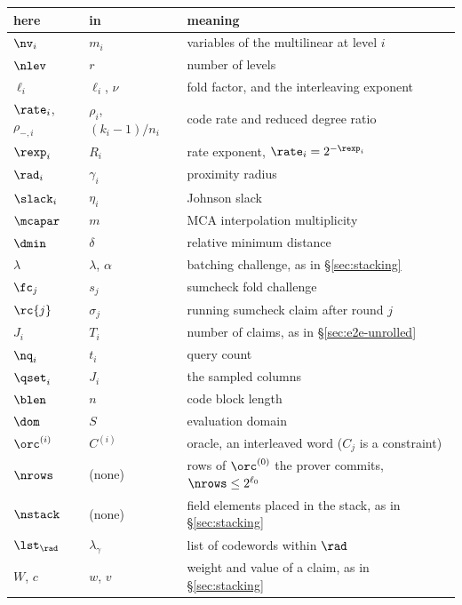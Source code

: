 \begin{center}\small
\begin{tabular}{@{}lll@{}}
\hline
here & in \cite{ACFY25,NA25,BCHKS25} & meaning\\
\hline
$\nv_i$        & $m_i$        & variables of the multilinear at level $i$\\
$\nlev$        & $r$          & number of levels\\
$\ell_i$       & $\ell_i$, $\nu$ & fold factor, and the interleaving exponent\\
$\rate_i$, $\rho_{-,i}$ & $\rho_i$, $(k_i-1)/n_i$ & code rate and reduced degree ratio\\
$\rexp_i$      & $R_i$        & rate exponent, $\rate_i=2^{-\rexp_i}$\\
$\rad_i$       & $\gamma_i$   & proximity radius\\
$\slack_i$     & $\eta_i$     & Johnson slack\\
$\mcapar$      & $m$          & MCA interpolation multiplicity\\
$\dmin$        & $\delta$     & relative minimum distance\\
$\lambda$      & $\lambda$, $\alpha$ & batching challenge, as in \S\ref{sec:stacking}\\
$\fc_j$        & $s_j$        & sumcheck fold challenge\\
$\rc{j}$       & $\sigma_j$   & running sumcheck claim after round $j$\\
$J_i$          & $T_i$        & number of claims, as in \S\ref{sec:e2e-unrolled}\\
$\nq_i$        & $t_i$        & query count\\
$\qset_i$      & $J_i$        & the sampled columns\\
$\blen$        & $n$          & code block length\\
$\dom$         & $S$          & evaluation domain\\
$\orc^{(i)}$   & $C^{(i)}$    & oracle, an interleaved word ($C_j$ is a constraint)\\
$\nrows$       & (none)       & rows of $\orc^{(0)}$ the prover commits, $\nrows \le 2^{\ell_0}$\\
$\nstack$      & (none)       & field elements placed in the stack, as in \S\ref{sec:stacking}\\
$\lst_{\rad}$  & $\lambda_\gamma$ & list of codewords within $\rad$\\
$W$, $c$       & $w$, $v$     & weight and value of a claim, as in \S\ref{sec:stacking}\\

\end{tabular}
\end{center}
